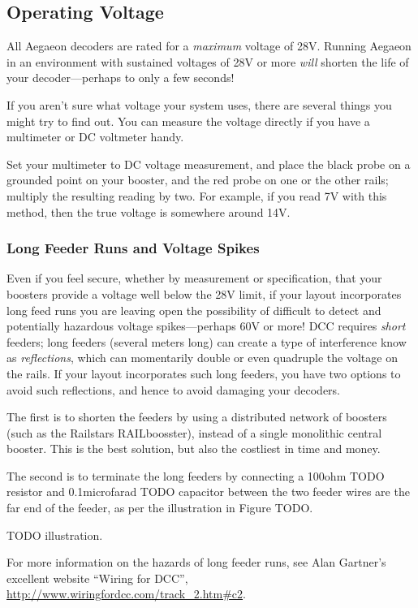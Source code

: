 \documentclass[12pt,letterpaper,draft]{memoir} %
\begin{document}
\subsection{Operating Voltage}

All Aegaeon decoders are rated for a \textit{maximum} voltage of 28V. Running Aegaeon in an environment with sustained voltages of 28V or more \textit{will} shorten the life of your decoder---perhaps to only a few seconds!

If you aren't sure what voltage your system uses, there are several things you might try to find out. You can measure the voltage directly if you have a multimeter or DC voltmeter handy.

Set your multimeter to DC voltage measurement, and place the black probe on a grounded point on your booster, and the red probe on one or the other rails; multiply the resulting reading by two. For example, if you read 7V with this method, then the true voltage is somewhere around 14V.

\subsubsection{Long Feeder Runs and Voltage Spikes}
Even if you feel secure, whether by measurement or specification, that your boosters provide a voltage well below the 28V limit, if your layout incorporates long feed runs you are leaving open the possibility of difficult to detect and potentially hazardous voltage spikes---perhaps 60V or more! DCC requires \textit{short} feeders; long feeders (several meters long) can create a type of interference know as \textit{reflections}, which can momentarily double or even quadruple the voltage on the rails. If your layout incorporates such long feeders, you have two options to avoid such reflections, and hence to avoid damaging your decoders.

The first is to shorten the feeders by using a distributed network of boosters (such as the Railstars RAILboosster), instead of a single monolithic central booster. This is the best solution, but also the costliest in time and money.

The second is to terminate the long feeders by connecting a 100ohm TODO resistor and 0.1microfarad TODO capacitor between the two feeder wires are the far end of the feeder, as per the illustration in Figure TODO.

TODO illustration.

For more information on the hazards of long feeder runs, see Alan Gartner's excellent website ``Wiring for DCC'', \url{http://www.wiringfordcc.com/track_2.htm#c2}.
\end{document}

